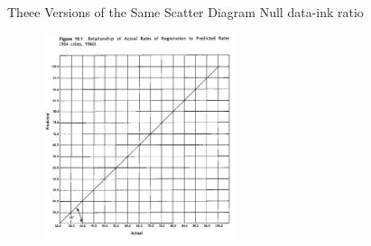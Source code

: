 \documentclass[aspectratio=1610]{beamer}
\begin{document}
\begin{frame}{Theee Versions of the Same Scatter Diagram}
	{Null data-ink ratio}
	\begin{figure}
		\begin{center}
			\includegraphics[width=0.5\textwidth]{images/null.png}
		\end{center}
	\end{figure}
\end{frame}
\end{document}

